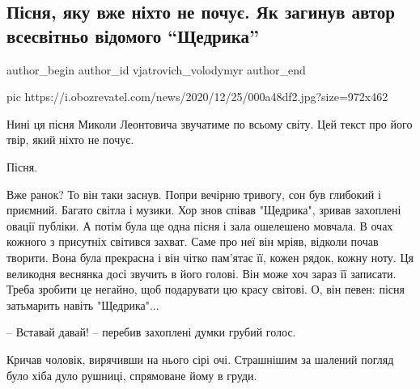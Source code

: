  
 
 
 
 
 
\subsection{Пісня, яку вже ніхто не почує. Як загинув автор всесвітньо відомого \enquote{Щедрика}}
\label{sec:25_12_2020.news.ua.obozrevatel.vjatrovich_volodymyr.1.leontovych_nkvd}
\ifcmt
  author_begin
   author_id vjatrovich_volodymyr
  author_end
\fi


\ifcmt
pic https://i.obozrevatel.com/news/2020/12/25/000a48df2.jpg?size=972x462
\fi

Нині ця пісня Миколи Леонтовича звучатиме по всьому світу. Цей текст про його
твір, який ніхто не почує.

Пісня. 

Вже ранок? То він таки заснув. Попри вечірню тривогу, сон був глибокий і
приємний. Багато світла і музики. Хор знов співав "Щедрика", зривав захоплені
овації публіки. А потім була ще одна пісня і зала ошелешено мовчала. В очах
кожного з присутніх світився захват. Саме про неї він мріяв, відколи почав
творити. Вона була прекрасна і він чітко пам'ятає її, кожен рядок, кожну ноту.
Ця великодня веснянка досі звучить в його голові. Він може хоч зараз її
записати. Треба зробити це негайно, щоб подарувати цю красу світові. О, він
певен: пісня затьмарить навіть "Щедрика"...

– Вставай давай! – перебив захоплені думки грубий голос.

Кричав чоловік, вирячивши на нього сірі очі. Страшнішим за шалений погляд було
хіба дуло рушниці, спрямоване йому в груди.

